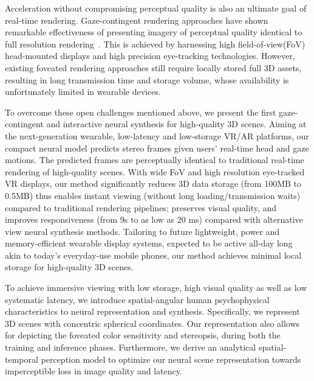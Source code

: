 Acceleration without compromising perceptual quality is also an ultimate goal of real-time rendering.
Gaze-contingent rendering approaches have shown remarkable effectiveness of presenting imagery of perceptual quality identical to full resolution rendering~\cite{Guenter:2012:F3G,Patney:2016:TFR,Tursun:2019:LCA}. This is achieved by harnessing high field-of-view(FoV) head-mounted displays and high precision eye-tracking technologies. However, existing foveated rendering approaches still require locally stored full 3D assets, resulting in long transmission time and storage volume, whose availability is unfortunately limited in wearable devices.


To overcome these open challenges mentioned above, we present the first gaze-contingent and interactive neural synthesis for high-quality 3D scenes. Aiming at the next-generation wearable, low-latency and low-storage VR/AR platforms, our compact neural model predicts stereo frames given users' real-time head and gaze motions. The predicted frames are perceptually identical to traditional real-time rendering of high-quality scenes.
With wide FoV and high resolution eye-tracked VR displays, our method significantly reduces 3D data storage (from 100MB to 0.5MB) thus enables instant viewing (without long loading/transmission waits) compared to traditional rendering pipelines; preserves visual quality, and improves responsiveness (from 9s to as low as 20 ms) compared with alternative view neural synthesis methods. 
Tailoring to future lightweight, power and memory-efficient wearable display systems, expected to be active all-day long akin to today's everyday-use mobile phones, our method achieves minimal local storage for high-quality 3D scenes.  %


To achieve immersive viewing with low storage, high visual quality as well as low systematic latency, we introduce spatial-angular human psychophysical characteristics to neural representation and synthesis. 
Specifically, we represent 3D scenes with concentric spherical coordinates. Our representation also allows for depicting the foveated color sensitivity and stereopsis, during both the training and inference phases. 
Furthermore, we derive an analytical spatial-temporal perception model to optimize our neural scene representation towards imperceptible loss in image quality and latency.


